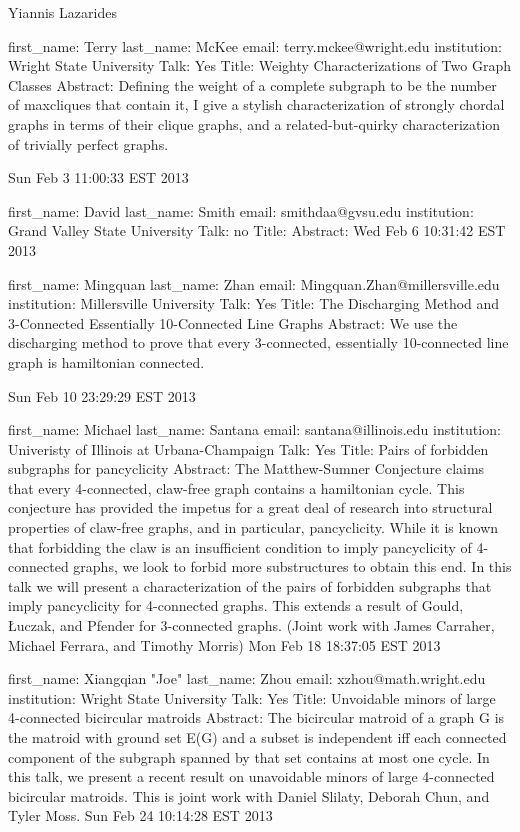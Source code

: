 \documentclass{article}
\newenvironment{absquote}
               {{\center\bfseries Abstract\endcenter}%
                 \list{}{\leftmargin2cm\rightmargin\leftmargin}%
                \item\relax\footnotesize}
               {\endlist}
\def\author#1{\center#1\endcenter}
\def\articletitle#1{\center{\bfseries\LARGE{#1}}\endcenter}
\def\serial#1{{\bfseries\hfill#1\hspace{1em}}}
\begin{document}
\articletitle{Some wonderful article}

\author{Yiannis Lazarides}

\begin{absquote}
\lipsum[1]
\serial{A-213}
\end{absquote}


first_name: Terry
last_name: McKee
email: terry.mckee@wright.edu
institution: Wright State University
Talk: Yes
Title: Weighty Characterizations of Two Graph Classes
Abstract: Defining the weight of a complete subgraph to be the number of maxcliques that contain it, I give a stylish characterization of strongly chordal graphs in terms of their clique graphs, and a related-but-quirky characterization of trivially perfect graphs.

Sun Feb  3 11:00:33 EST 2013

first_name: David
last_name: Smith
email: smithdaa@gvsu.edu
institution: Grand Valley State University
Talk: no
Title:
Abstract:
Wed Feb  6 10:31:42 EST 2013

first_name: Mingquan
last_name: Zhan
email: Mingquan.Zhan@millersville.edu
institution: Millersville University
Talk: Yes
Title: The Discharging Method and 3-Connected Essentially 10-Connected Line Graphs
Abstract: We use the discharging method to prove that every 3-connected, essentially 10-connected line graph is hamiltonian connected.

Sun Feb 10 23:29:29 EST 2013


first_name: Michael
last_name: Santana
email: santana@illinois.edu
institution: Univeristy of Illinois at Urbana-Champaign
Talk: Yes
Title: Pairs of forbidden subgraphs for pancyclicity
Abstract: The Matthew-Sumner Conjecture claims that every 4-connected, claw-free graph contains a hamiltonian cycle.  This conjecture has provided the impetus for a great deal of research into structural properties of claw-free graphs, and in particular, pancyclicity.  While it is known that forbidding the claw is an insufficient condition to imply pancyclicity of 4-connected graphs, we look to forbid more substructures to obtain this end.  In this talk we will present a characterization of the pairs of forbidden subgraphs that imply pancyclicity for 4-connected graphs.  This extends a result of Gould, {\L}uczak, and Pfender for 3-connected graphs.  (Joint work with James Carraher, Michael Ferrara, and Timothy Morris)
Mon Feb 18 18:37:05 EST 2013

first_name: Xiangqian  "Joe"
last_name: Zhou
email: xzhou@math.wright.edu
institution: Wright State University
Talk: Yes
Title: Unvoidable minors of large 4-connected bicircular matroids
Abstract: The bicircular matroid of a graph G is the matroid with ground set E(G) and a subset is independent iff each connected component of the subgraph spanned by that set contains at most one cycle.   In this talk, we present a recent result on unavoidable minors of large 4-connected bicircular matroids. This is joint work with Daniel Slilaty, Deborah Chun, and Tyler Moss.
Sun Feb 24 10:14:28 EST 2013
\end{document}
